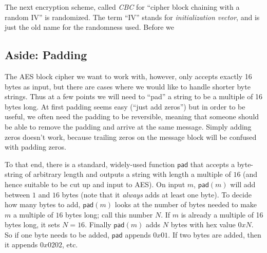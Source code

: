 \documentclass[11pt]{article}
\newcommand{\pad}{\mathsf{pad}}
\begin{document}
The next encryption scheme, called \emph{CBC} for ``cipher block chaining with
a random IV'' is randomized. The term ``IV'' stands for \emph{initialization
vector},  and is just the old name for the randomness used. 
Before we 

\subsection{Aside: Padding}

The AES block cipher we want to work with, however, only accepts exactly 16
bytes as input, but there are cases where we would like to handle shorter byte
strings. Thus at a few points we will need to ``pad'' a string to be a multiple
of 16 bytes long.  At first padding seems easy (``just add zeros'') but in
order to be useful, we often need the padding to be reversible, meaning that
someone should be able to remove the padding and arrive at the same message.
Simply adding zeros doesn't work, because trailing zeros on the message block
will be confused with padding zeros.

To that end, there is a standard, widely-used function $\pad$ that accepts a
byte-string of arbitrary length and outputs a string with length a multiple of
$16$ (and hence suitable to be cut up and input to AES). On input $m$,
$\pad(m)$ will add between $1$ and $16$ bytes (note that it \emph{always} adds
at least one byte). To decide how many bytes to add, $\pad(m)$ looks at the
number of bytes needed to make $m$ a multiple of $16$ bytes long; call this
number $N$. If $m$ is already a multiple of 16 bytes long, it sets $N=16$.
Finally $\pad(m)$ adds $N$ bytes with hex value $0xN$.  So if one byte needs to
be added, $\pad$ appends $0x01$. If two bytes are added, then it appends
$0x0202$, etc.
\end{document}
